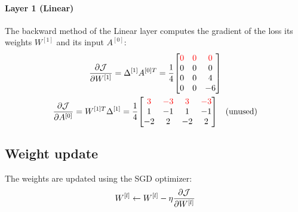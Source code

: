 \paragraph{Layer 1 (Linear)} The backward method of the Linear layer computes the gradient of the loss \wrt its weights $W^{[1]}$ and its input $A^{[0]}$:
\begin{gather*}
    \pdv{\J}{W^{[1]}} = \Delta^{[1]} A^{[0]T} = \frac{1}{4} \mqty[
        \color{red} 0 & \color{red} 0 & \color{red} 0 \\
        0 & 0 & 0 \\
        0 & 0 & 4 \\
        0 & 0 & -6
    ]\\
    \pdv{\J}{A^{[0]}} = W^{[1]T} \Delta^{[1]} = \frac{1}{4} \mqty[
        \color{red} 3 & \color{red} -3 & \color{red} 3 & \color{red} -3 \\
        1 & -1 & 1 & -1 \\
        -2 & 2 & -2 & 2
    ] \quad \text{(unused)}
\end{gather*}

\subsection{Weight update}

The weights are updated using the \ac{SGD} optimizer:
\begin{equation*}
    W^{[l]} \gets W^{[l]} - \eta \pdv{\mathcal{J}}{W^{[l]}} \\
\end{equation*}

